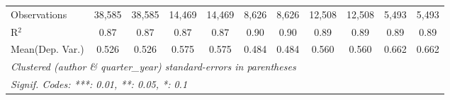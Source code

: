 \begin{tabular}{lcccccccccc}
   Observations                             & 38,585         & 38,585         & 14,469         & 14,469         & 8,626         & 8,626          & 12,508        & 12,508         & 5,493         & 5,493\\  
   R$^2$                                    & 0.87           & 0.87           & 0.87           & 0.87           & 0.90          & 0.90           & 0.89          & 0.89           & 0.89          & 0.89\\  
Mean(Dep. Var.) & 0.526 & 0.526 & 0.575 & 0.575 & 0.484 & 0.484 & 0.560 & 0.560 & 0.662 & 0.662 \\
   \midrule \midrule
   \multicolumn{11}{l}{\emph{Clustered (author \& quarter\_year) standard-errors in parentheses}}\\
   \multicolumn{11}{l}{\emph{Signif. Codes: ***: 0.01, **: 0.05, *: 0.1}}\\
\end{tabular}
\par\endgroup

